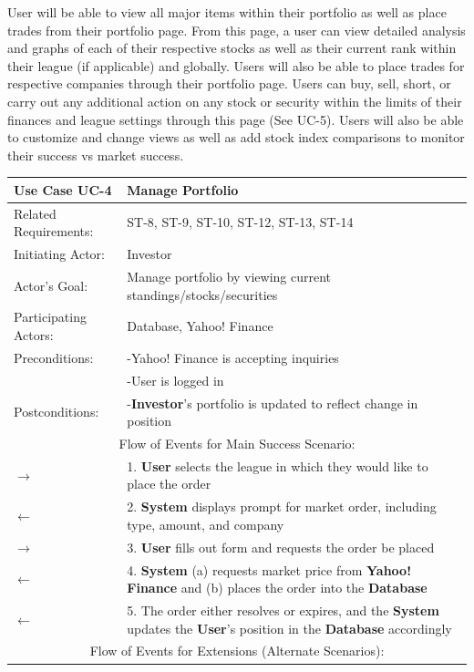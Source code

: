 User will be able to view all major items within their portfolio as well as place trades from
their portfolio page. From this page, a user can view detailed analysis and graphs of each
of their respective stocks as well as their current rank within their league (if applicable)
and globally. Users will also be able to place trades for respective companies through their
portfolio page. Users can buy, sell, short, or carry out any additional action on any stock
or security within the limits of their finances and league settings through this page (See UC-5).
Users will also be able to customize and change views as well as add stock index comparisons
to monitor their success vs market success.\\

\begin{centering}
\label{UC-4}
\renewcommand\arraystretch{1.3}
\begin{longtable}{|p{1.2in} p{5in}|}
\hline
\bfseries{\color{color1}Use Case UC-4} &
\bfseries{\color{color1}Manage Portfolio} \\
\hline
Related Requirements: & ST-8, ST-9, ST-10, ST-12, ST-13, ST-14 \\
Initiating Actor:     & Investor \\
Actor's Goal:         & Manage portfolio by viewing current standings/stocks/securities \\
Participating Actors: & Database, Yahoo! Finance \\
Preconditions:        & -Yahoo! Finance is accepting inquiries \\
                      & -User is logged in \\
Postconditions:       & -\textbf{Investor}'s portfolio is updated to reflect change
                        in position \\
\hline
\multicolumn{2}{|c|}{\color{color1}Flow of Events for Main Success Scenario:}\\
\hline
$\rightarrow$ & 1. \textbf{User} selects the league in which they would like to place the order \\
$\leftarrow$ & 2. \textbf{System} displays prompt for market order, including type, amount, and company \\
$\rightarrow$ & 3. \textbf{User} fills out form and requests the order be placed \\
$\leftarrow$ & 4. \textbf{System} (a) requests market price from \textbf{Yahoo! Finance} and (b) places the order into the \textbf{Database} \\
$\leftarrow$ & 5. The order either resolves or expires, and the \textbf{System} updates the \textbf{User}'s position in the \textbf{Database} accordingly \\
\hline
\multicolumn{2}{|c|}{\color{color1}Flow of Events for Extensions (Alternate Scenarios):} \\
\hline


\end{longtable}
\end{centering}
